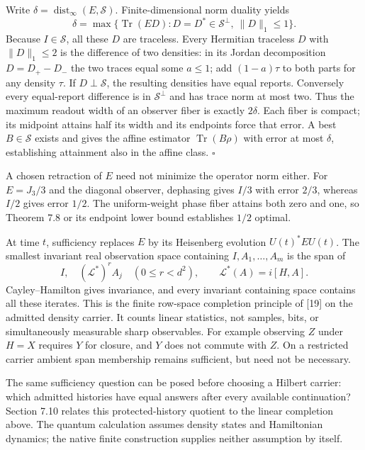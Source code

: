 \documentclass[
  11pt,
]{article}
\begin{document}
Write \(\delta=\operatorname{dist}_\infty(E,\mathcal S)\). Finite-dimensional
norm duality yields
\[
\delta=\max\{\operatorname{Tr}(ED):D=D^*\in\mathcal S^\perp,
                                         \ \lVert D\rVert_1\le1\}.
\]
Because \(I\in\mathcal S\), all these \(D\) are traceless. Every Hermitian
traceless \(D\) with \(\lVert D\rVert_1\le2\) is the difference of two densities: in its
Jordan decomposition \(D=D_+-D_-\) the two traces equal some \(a\le1\); add
\((1-a)\tau\) to both parts for any density \(\tau\). If \(D\perp\mathcal S\),
the resulting densities have equal reports. Conversely every equal-report
difference is in \(\mathcal S^\perp\) and has trace norm at most two.
Thus the maximum readout width of an observer fiber is exactly \(2\delta\).
Each fiber is compact; its midpoint attains half its width and its endpoints
force that error. A best \(B\in\mathcal S\) exists and gives the affine
estimator \(\operatorname{Tr}(B\rho)\) with error at most \(\delta\), establishing
attainment also in the affine class. \(\square\)

A chosen retraction of \(E\) need not minimize the operator norm either. For
\(E=J_3/3\) and the diagonal observer, dephasing gives \(I/3\) with error \(2/3\),
whereas \(I/2\) gives error \(1/2\). The uniform-weight phase fiber attains both
zero and one, so Theorem 7.8 or its endpoint lower bound establishes \(1/2\) optimal.

At time \(t\), sufficiency replaces \(E\) by its Heisenberg evolution
\(U(t)^*EU(t)\). The smallest invariant real observation space containing
\(I,A_1,\ldots,A_m\) is the span of
\[
I,\quad (\mathcal L^*)^rA_j\quad(0\le r<d^2),\qquad
\mathcal L^*(A)=i[H,A].
\]
Cayley--Hamilton gives invariance, and every invariant containing space contains
all these iterates. This is the finite row-space completion principle of {[}19{]}
on the admitted density carrier. It counts linear statistics, not samples,
bits, or simultaneously measurable sharp observables. For example observing
\(Z\) under \(H=X\) requires \(Y\) for closure, and \(Y\) does not commute with \(Z\).
On a restricted carrier ambient span membership remains sufficient, but need
not be necessary.

The same sufficiency question can be posed before choosing a Hilbert carrier:
which admitted histories have equal answers after every available continuation?
Section 7.10 relates this protected-history quotient to the linear completion
above. The quantum calculation assumes density states and Hamiltonian dynamics;
the native finite construction supplies neither assumption by itself.
\end{document}
